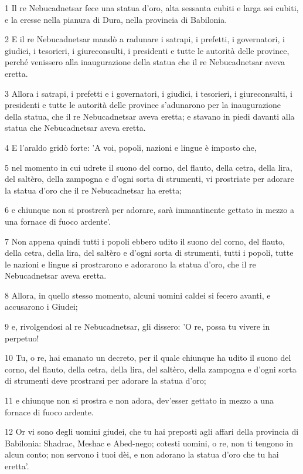 \par 1 Il re Nebucadnetsar fece una statua d'oro, alta sessanta cubiti e larga sei cubiti, e la eresse nella pianura di Dura, nella provincia di Babilonia.
\par 2 E il re Nebucadnetsar mandò a radunare i satrapi, i prefetti, i governatori, i giudici, i tesorieri, i giureconsulti, i presidenti e tutte le autorità delle province, perché venissero alla inaugurazione della statua che il re Nebucadnetsar aveva eretta.
\par 3 Allora i satrapi, i prefetti e i governatori, i giudici, i tesorieri, i giureconsulti, i presidenti e tutte le autorità delle province s'adunarono per la inaugurazione della statua, che il re Nebucadnetsar aveva eretta; e stavano in piedi davanti alla statua che Nebucadnetsar aveva eretta.
\par 4 E l'araldo gridò forte: 'A voi, popoli, nazioni e lingue è imposto che,
\par 5 nel momento in cui udrete il suono del corno, del flauto, della cetra, della lira, del saltèro, della zampogna e d'ogni sorta di strumenti, vi prostriate per adorare la statua d'oro che il re Nebucadnetsar ha eretta;
\par 6 e chiunque non si prostrerà per adorare, sarà immantinente gettato in mezzo a una fornace di fuoco ardente'.
\par 7 Non appena quindi tutti i popoli ebbero udito il suono del corno, del flauto, della cetra, della lira, del saltèro e d'ogni sorta di strumenti, tutti i popoli, tutte le nazioni e lingue si prostrarono e adorarono la statua d'oro, che il re Nebucadnetsar aveva eretta.
\par 8 Allora, in quello stesso momento, alcuni uomini caldei si fecero avanti, e accusarono i Giudei;
\par 9 e, rivolgendosi al re Nebucadnetsar, gli dissero: 'O re, possa tu vivere in perpetuo!
\par 10 Tu, o re, hai emanato un decreto, per il quale chiunque ha udito il suono del corno, del flauto, della cetra, della lira, del saltèro, della zampogna e d'ogni sorta di strumenti deve prostrarsi per adorare la statua d'oro;
\par 11 e chiunque non si prostra e non adora, dev'esser gettato in mezzo a una fornace di fuoco ardente.
\par 12 Or vi sono degli uomini giudei, che tu hai preposti agli affari della provincia di Babilonia: Shadrac, Meshac e Abed-nego; cotesti uomini, o re, non ti tengono in alcun conto; non servono i tuoi dèi, e non adorano la statua d'oro che tu hai eretta'.
